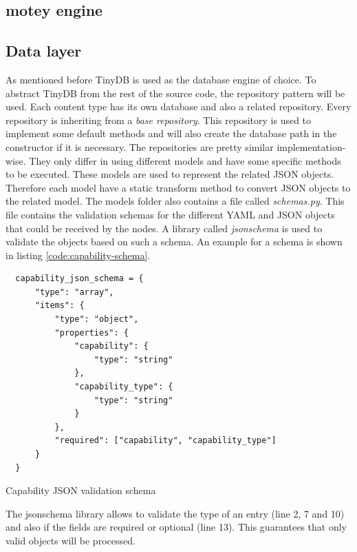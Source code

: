 \subsection{motey engine}

\subsection{Data layer}
\label{subsection:impl-data-layer}
As mentioned before TinyDB is used as the database engine of choice.
To abstract TinyDB from the rest of the source code, the repository pattern will be used.
Each content type has its own database and also a related repository.
Every repository is inheriting from a \textit{base repository}.
This repository is used to implement some default methods and will also create the database path in the constructor if it is necessary.
The repositories are pretty similar implementation-wise.
They only differ in using different models and have some specific methods to be executed.
These models are used to represent the related \ac{JSON} objects.
Therefore each model have a static transform method to convert \ac{JSON} objects to the related model.
The models folder also contains a file called \textit{schemas.py}.
This file contains the validation schemas for the different \ac{YAML} and \ac{JSON} objects that could be received by the nodes.
A library called \textit{jsonschema} is used to validate the objects based on such a schema.
An example for a schema is shown in listing \ref{code:capability-schema}.
\begin{listing}[H]
  \begin{verbatim}
  capability_json_schema = {
      "type": "array",
      "items": {
          "type": "object",
          "properties": {
              "capability": {
                  "type": "string"
              },
              "capability_type": {
                  "type": "string"
              }
          },
          "required": ["capability", "capability_type"]
      }
  }
  \end{verbatim}
  \caption{Capability JSON validation schema}
  \label{code:capability-schema}
\end{listing}
The jsonschema library allows to validate the type of an entry (line 2, 7 and 10) and also if the fields are required or optional (line 13).
This guarantees that only valid objects will be processed.

